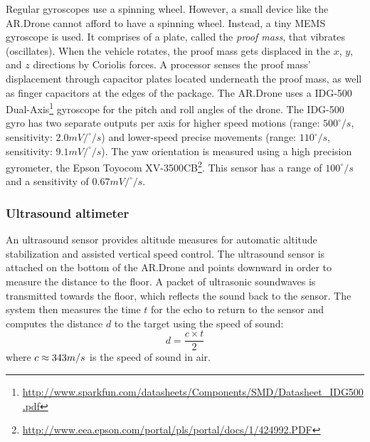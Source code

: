 Regular gyroscopes use a spinning wheel.
However, a small device like the AR.Drone cannot afford to have a spinning wheel.
Instead, a tiny MEMS gyroscope is used. 
It comprises of a plate, called the \textit{proof mass}, that vibrates (oscillates).
When the vehicle rotates, the proof mass gets displaced in the $x$, $y$, and $z$ directions by Coriolis forces.
A processor senses the proof mass’ displacement through capacitor plates located underneath the proof mass, as well as finger capacitors at the edges of the package.
The AR.Drone uses a IDG-500 Dual-Axis\footnote{\url{http://www.sparkfun.com/datasheets/Components/SMD/Datasheet_IDG500.pdf}} gyroscope for the pitch and roll angles of the drone.
The IDG-500 gyro has two separate outputs per axis for higher speed motions (range: $500^{\circ}/s$, sensitivity: $2.0mV/^{\circ}/s$) and lower-speed precise movements (range: $110^{\circ}/s$, sensitivity: $9.1mV/^{\circ}/s$).
The yaw orientation is measured using a high precision gyrometer, the Epson Toyocom XV-3500CB\footnote{\url{http://www.eea.epson.com/portal/pls/portal/docs/1/424992.PDF}}.
This sensor has a range of $100^{\circ}/s$ and a sensitivity of $0.67mV/^{\circ}/s$.


\subsubsection{Ultrasound altimeter}
\label{sec:ultrasound_altimeter}
An ultrasound sensor provides altitude measures for automatic altitude stabilization and assisted vertical speed control.
The ultrasound sensor is attached on the bottom of the AR.Drone and points downward in order to measure the distance to the floor.
A packet of ultrasonic soundwaves is transmitted towards the floor, which reflects the sound back to the sensor.
The system then measures the time $t$ for the echo to return to the sensor and computes the distance $d$ to the target using the speed of sound:
\begin{equation}
d = \frac{c \times t}{2}
\end{equation}
where $c \approx 343\small{m/s}$ is the speed of sound in air.

